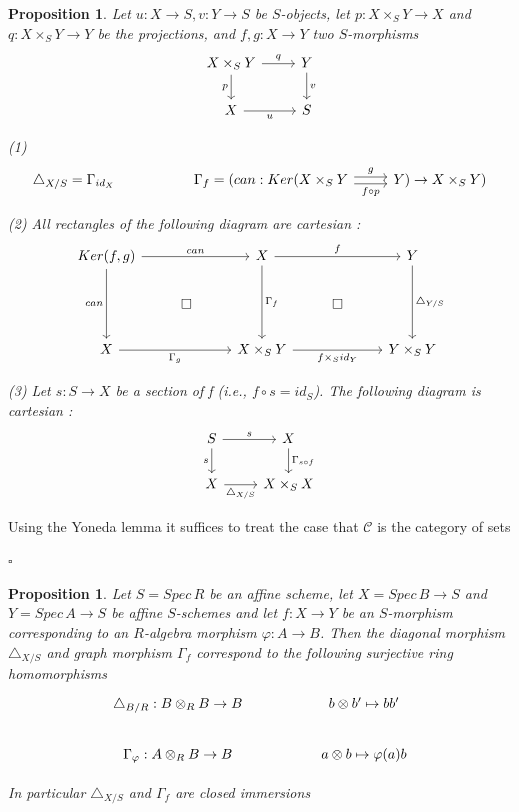 \documentclass{article}
\newtheorem{proposition}[theorem]{Proposition}
\newenvironment{Proof}{{\noindent \indent \it Proof:\quad}}{\hfill $\square$\par}
\begin{document}
\begin{proposition}
Let $u: X \to S, v : Y \to S$ be $S$-objects, let $p: X \times_S Y \to X$ and
$q : X \times_S Y \to Y$ be the projections, and $f,g : X \to Y$ two $S$-morphisms
\[\begin{tikzcd}
	{X\times_S Y} & Y \\
	X & S
	\arrow["u"', from=2-1, to=2-2]
	\arrow["v", from=1-2, to=2-2]
	\arrow["p"', from=1-1, to=2-1]
	\arrow["q", from=1-1, to=1-2]
\end{tikzcd}\]

(1) \[\begin{tikzcd}
	{\triangle_{X/S}=\Gamma_{id_X}} && {\Gamma_f=(can: Ker( X \times_S Y} & {Y) \to X \times_S Y )}
	\arrow["g", shift left, from=1-3, to=1-4]
	\arrow["{f\circ p}"', shift right, from=1-3, to=1-4]
\end{tikzcd}\]

(2) All rectangles of the following diagram are cartesian :
\[\begin{tikzcd}
	{Ker(f,g)} && X && Y \\
	& \square && \square \\
	X && {X\times_SY} && {Y\times_SY}
	\arrow["can", from=1-1, to=1-3]
	\arrow["can"', from=1-1, to=3-1]
	\arrow["{\Gamma_f}", from=1-3, to=3-3]
	\arrow["{\triangle_{Y/S}}", from=1-5, to=3-5]
	\arrow["{f\times_S id_Y}"', from=3-3, to=3-5]
	\arrow["f", from=1-3, to=1-5]
	\arrow["{\Gamma_g}"', from=3-1, to=3-3]
\end{tikzcd}\]

(3) Let $s: S \to X$ be a section of f (i.e., $f \circ s = id_S$). The following diagram is cartesian :
\[\begin{tikzcd}
	S & X \\
	X & {X\times_SX}
	\arrow["{\triangle_{X/S}}"', from=2-1, to=2-2]
	\arrow["{\Gamma_{s\circ f}}", from=1-2, to=2-2]
	\arrow["s"', from=1-1, to=2-1]
	\arrow["s", from=1-1, to=1-2]
\end{tikzcd}\]
\end{proposition}
\begin{Proof}
Using the Yoneda lemma it suffices to treat the case that $\mathcal C$ is the category of sets

\end{Proof}

\begin{proposition}
Let $S = Spec\, R$ be an affine scheme, let $X = Spec\, B \to S$ and
$Y = Spec\, A \to S$ be affine $S$-schemes and let $f : X \to Y$ be an $S$-morphism corresponding
to an $R$-algebra morphism $\varphi: A \to B$. Then the diagonal morphism $\triangle_{X/S}$ and graph
morphism $\Gamma_f$ correspond to the following surjective ring homomorphisms
\[\begin{tikzcd}
	{\triangle_{B/R}:B\otimes_R B\to B} && {b\otimes b^\prime\mapsto bb^\prime} \\
	{\Gamma_\varphi:A\otimes_R B\to B} && {a\otimes b \mapsto \varphi(a)b}
\end{tikzcd}\]

In particular $\triangle_{X/S}$ and $\Gamma_f$ are closed immersions
\end{proposition}
\end{document}
